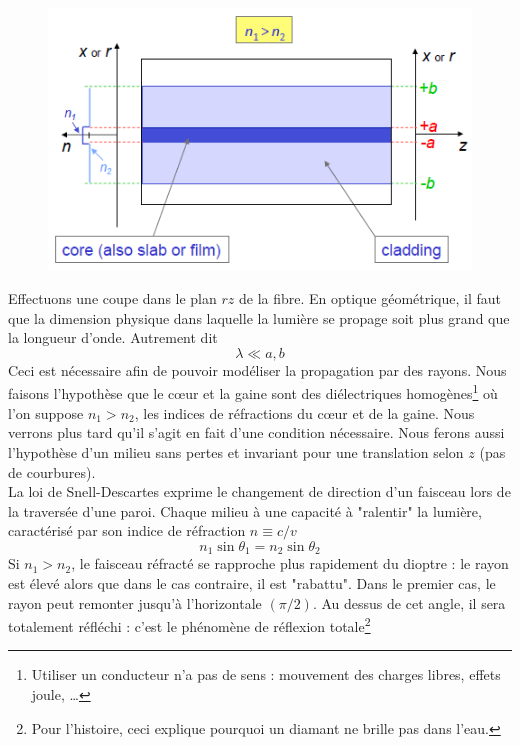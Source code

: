 	\begin{figure}
	\vspace{-9mm}
	\includegraphics[scale=0.6]{ch1/image2.png}
	\end{figure}
Effectuons une coupe dans le plan $rz$ de la fibre. En optique géométrique, il faut que la dimension physique dans laquelle la lumière se propage soit plus grand que la longueur d'onde. Autrement dit
\begin{equation}
\lambda \ll a,b
\end{equation}
Ceci est nécessaire afin de pouvoir modéliser la propagation par des rayons. Nous faisons l'hypothèse
que le cœur et la gaine sont des diélectriques homogènes\footnote{Utiliser un conducteur n'a pas de sens
: mouvement des charges libres, effets joule, \dots} où l'on suppose $n_1>n_2$, les indices de
réfractions du cœur et de la gaine. Nous verrons plus tard qu'il s'agit en fait d'une condition
nécessaire. Nous ferons aussi l'hypothèse d'un milieu sans pertes et invariant pour une translation
selon $z$ (pas de courbures).\\

La loi de Snell-Descartes exprime le changement de direction d'un faisceau lors de la traversée
d'une paroi. Chaque milieu à une capacité à "ralentir" la lumière, caractérisé par son indice
de réfraction $n\equiv c/v$
\begin{equation}
n_1 \sin\theta_1=n_2 \sin\theta_2
\end{equation}
Si $n_1>n_2$, le faisceau réfracté se rapproche plus rapidement du dioptre : le rayon est élevé alors
que dans le cas contraire, il est "rabattu". Dans le premier cas, le rayon peut remonter jusqu'à
l'horizontale $(\pi/2)$. Au dessus de cet angle, il sera totalement réfléchi : c'est le phénomène
de réflexion totale\footnote{Pour l'histoire, ceci explique pourquoi un diamant ne brille pas dans
l'eau.}\\


